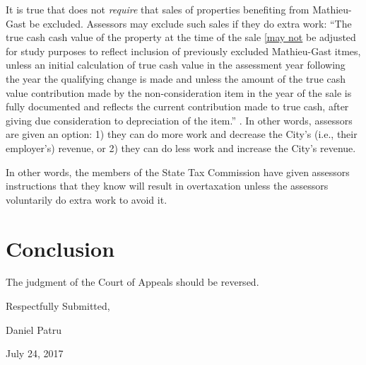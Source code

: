 \documentclass[12pt,\documentclassflag]{michiganCourtOfAppealsBrief}
\begin{document}
It is true that \cite{STC Bulletin No. 7 of 2014} does not \emph{require} that sales of properties benefiting from Mathieu-Gast be excluded. Assessors may exclude such sales if they do extra work: ``The true cash cash value of the property at the time of the sale \underline{[may not} be adjusted for study purposes to reflect inclusion of previously excluded Mathieu-Gast itmes, unless an initial calculation of true cash value in the assessment year following the year the qualifying change is made and unless the amount of the true cash value contribution made by the non-consideration item in the year of the sale is fully documented and reflects the current contribution made to true cash, after giving due consideration to depreciation of the item.'' . In other words, assessors are given an option: 1) they can do more work and decrease the City's (i.e., their employer's) revenue, or 2) they can do less work and increase the City's revenue.

In other words, the members of the State Tax Commission have given assessors instructions that they know will result in overtaxation unless the assessors voluntarily do extra work to avoid it.


 
 
\section{Conclusion}

 

 
The judgment of the Court of Appeals should be reversed.

\vspace{1\baselineskip}

{ \setlength{\leftskip}{3.5in}

  Respectfully Submitted,

  Daniel Patru

  July 24, 2017

  \setlength{\leftskip}{0pt}}
\end{document}
